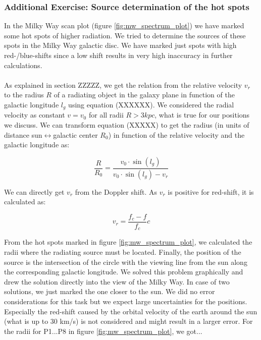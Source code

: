 \subsubsection{Additional Exercise: Source determination of the hot spots}\label{sec:HotSpots}
In the Milky Way scan plot (figure \ref{fig:mw_spectrum_plot}) we have marked some hot spots of higher radiation. We tried to determine the sources of these spots in the Milky Way galactic disc. We have marked just spots with high red-/blue-shifts since a low shift results in very high inaccuracy in further calculations. \\
 \\
As explained in section ZZZZZ, we get the relation from the relative velocity $v_r$ to the radius $R$ of a radiating object in the galaxy plane in function of the galactic longitude $l_g$ using equation (XXXXXX). We considered the radial velocity as constant $v = v_0$ for all radii $R > 3kpc$, what is true for our positions we discuss. We can transform equation (XXXXX) to get the radius (in units of distance sun$\leftrightarrow$galactic center $R_0$) in function of the relative velocity and the galactic longitude as:

\begin{equation}
	\frac{R}{R_0}=\frac{v_0\cdot \sin(l_g)}{v_0\cdot \sin(l_g)-v_r}
\end{equation}

We can directly get $v_r$ from the Doppler shift. As $v_r$ is positive for red-shift, it is calculated as:

\begin{equation}
	v_r = \frac{f_c-f}{f_c} c
\end{equation}

From the hot spots marked in figure \ref{fig:mw_spectrum_plot}, we calculated the radii where the radiating source must be located. Finally, the position of the source is the intersection of the circle with the viewing line from the sun along the corresponding galactic longitude. We solved this problem graphically and drew the solution directly into the view of the Milky Way. In case of two solutions, we just marked the one closer to the sun. We did no error considerations for this task but we expect large uncertainties for the positions. Especially the red-shift caused by the orbital velocity of the earth around the sun (what is up to 30 km/s) is not considered and might result in a larger error. For the radii for P1...P8 in figure \ref{fig:mw_spectrum_plot}, we got...

